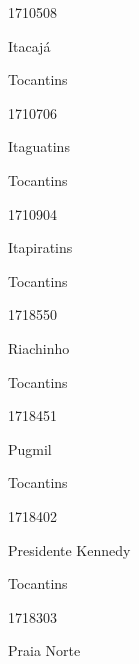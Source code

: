 \documentclass[
  letterpaper,
]{report}
\begin{document}
1710508

\n      

Itacajá

\n    

\n    

\n      

Tocantins

\n      

1710706

\n      

Itaguatins

\n    

\n    

\n      

Tocantins

\n      

1710904

\n      

Itapiratins

\n    

\n    

\n      

Tocantins

\n      

1718550

\n      

Riachinho

\n    

\n    

\n      

Tocantins

\n      

1718451

\n      

Pugmil

\n    

\n    

\n      

Tocantins

\n      

1718402

\n      

Presidente Kennedy

\n    

\n    

\n      

Tocantins

\n      

1718303

\n      

Praia Norte

\n    

\n    
\end{document}
